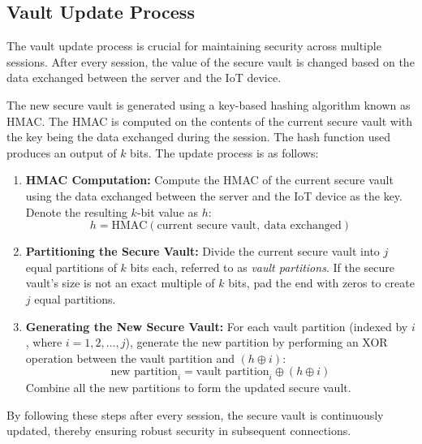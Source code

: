 \documentclass[10pt,twocolumn,letterpaper]{article}
\begin{document}
\subsection{Vault Update Process}
The vault update process is crucial for maintaining security across multiple sessions. After every session, the value of the secure vault is changed based on the data exchanged between the server and the IoT device.

The new secure vault is generated using a key-based hashing algorithm known as HMAC. 
The HMAC is computed on the contents of the current secure vault with the key being the data exchanged during the session. The hash function used produces an output of $k$ bits. The update process is as follows:

\begin{enumerate}
    \item \textbf{HMAC Computation:}  
    Compute the HMAC of the current secure vault using the data exchanged between the server and the IoT device as the key. Denote the resulting $k$-bit value as $h$:
    \[
    h = \text{HMAC}(\text{current secure vault},\ \text{data exchanged})
    \]
    
    \item \textbf{Partitioning the Secure Vault:}  
    Divide the current secure vault into $j$ equal partitions of $k$ bits each, referred to as \emph{vault partitions}. If the secure vault's size is not an exact multiple of $k$ bits, pad the end with zeros to create $j$ equal partitions.
    
    \item \textbf{Generating the New Secure Vault:}  
    For each vault partition (indexed by $i$, where $i = 1, 2, \dots, j$), generate the new partition by performing an XOR operation between the vault partition and $(h \oplus i)$:
    \[
    \text{new partition}_i = \text{vault partition}_i \oplus (h \oplus i)
    \]
    Combine all the new partitions to form the updated secure vault.
    
\end{enumerate}

By following these steps after every session, the secure vault is continuously updated, thereby ensuring robust security in subsequent connections.
\end{document}
